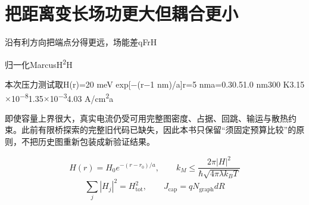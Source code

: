 \section{{\cjkfont 把距离变长场功更大但耦合更小}\allowbreak{}}\label{sec:30}
{\cjkfont 沿有利方向把端点分得更远，场能差}\allowbreak{}qFr\allowbreak{}H\allowbreak{}
\par
{\cjkfont 归一化}\allowbreak{}Marcus\allowbreak{}H\textsuperscript{2}\allowbreak{}H\allowbreak{}
\par
{\cjkfont 本次压力测试取}\allowbreak{}H(r)=\allowbreak{}20 meV exp[−(r−1 nm)/a]\allowbreak{}r=\allowbreak{}5 nm\allowbreak{}a=\allowbreak{}0.3\allowbreak{}0.5\allowbreak{}1.0 nm\allowbreak{}300 K\allowbreak{}3.15\ensuremath{\times}10\textsuperscript{−8}\allowbreak{}1.35\ensuremath{\times}10\textsuperscript{−3}\allowbreak{}4.03 A/cm\textsuperscript{2}\allowbreak{}a\allowbreak{}
\par
{\cjkfont 即使容量上界很大，真实电流仍受可用完整图密度、占据、回跳、输运与散热约束。此前有限桥探索的完整旧代码已缺失，因此本书只保留“须固定预算比较”的原则，不把历史图重新包装成新验证结果。}\allowbreak{}
\par
\begin{equation}
H(r)=H_0e^{-(r-r_0)/a},\qquad k_M\leq\frac{2\pi|H|^2}{\hbar\sqrt{4\pi\lambda k_BT}}
\label{eq:33}\end{equation}
\begin{equation}
\sum_j|H_j|^2=H_{\mathrm{tot}}^2,\qquad J_{\mathrm{cap}}=qN_{\mathrm{graph}}dR
\label{eq:34}\end{equation}
